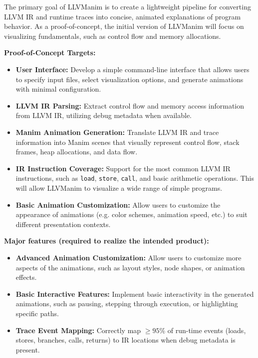 The primary goal of LLVManim is to create a lightweight pipeline for converting
LLVM IR and runtime traces into concise, animated explanations of program
behavior. As a proof-of-concept, the initial version of LLVManim will focus on
visualizing fundamentals, such as control flow and memory allocations.

\textbf{Proof-of-Concept Targets:}
\begin{itemize}
  \item \textbf{User Interface:} Develop a simple command-line interface that allows users to specify input files, select visualization options, and generate animations with minimal configuration.
  
  \item \textbf{LLVM IR Parsing:} Extract control flow and memory access information from LLVM IR, utilizing debug metadata when available.
  
  \item \textbf{Manim Animation Generation:} Translate LLVM IR and trace information into Manim scenes that visually represent control flow, stack frames, heap allocations, and data flow.
    
  \item \textbf{IR Instruction Coverage:} Support for the most common LLVM IR instructions, such as \texttt{load}, \texttt{store}, \texttt{call}, and basic arithmetic operations. This will allow LLVManim to visualize a wide range of simple programs.
    
  \item \textbf{Basic Animation Customization:} Allow users to customize the appearance of animations (e.g. color schemes, animation speed, etc.) to suit different presentation contexts.
\end{itemize}

\textbf{Major features (required to realize the intended product):}
\begin{itemize}
  \item \textbf{Advanced Animation Customization:} Allow users to customize more aspects of the animations, such as layout styles, node shapes, or animation effects.
  \item \textbf{Basic Interactive Features:} Implement basic interactivity in the generated animations, such as pausing, stepping through execution, or highlighting specific paths.
  \item \textbf{Trace Event Mapping:} Correctly map $\geq95\%$ of run-time events (loads, stores, branches, calls, returns) to IR locations when debug metadata is present.
\end{itemize}

